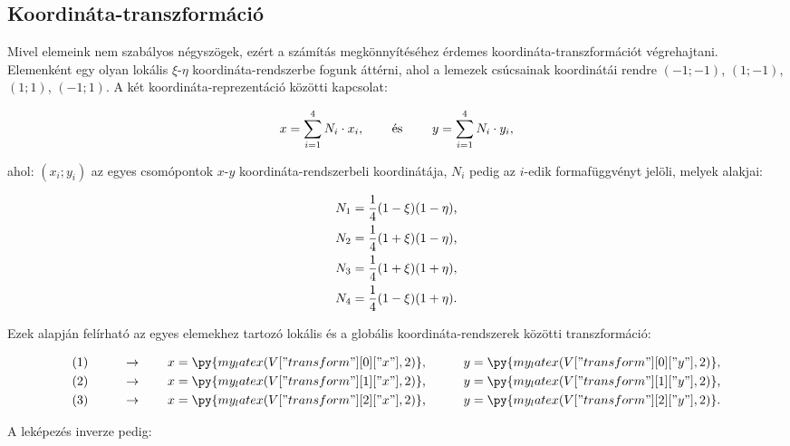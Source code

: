 \subsection{Koordináta-transzformáció}

Mivel elemeink nem szabályos négyszögek, ezért a számítás megkönnyítéséhez
érdemes koordináta-transzformációt végrehajtani. Elemenként egy olyan lokális
$\xi$-$\eta$ koordináta-rendszerbe fogunk áttérni, ahol a lemezek csúcsainak
koordinátái rendre $(-1;-1)$, $(1;-1)$, $(1;1)$, $(-1;1)$. A két
koordináta-reprezentáció közötti kapcsolat:
\begin{myframe}
  \begin{equation}
    x = \sum_{i=1}^4 N_i \cdot x_i
    \text,
    \qquad
    \text{ és }
    \qquad
    y = \sum_{i=1}^4 N_i \cdot y_i
    \text,
  \end{equation}
\end{myframe}
ahol: $(x_i; y_i)$ az egyes csomópontok $x$-$y$ koordináta-rendszerbeli
koordinátája, $N_i$ pedig az $i$-edik formafüggvényt jelöli, melyek alakjai:
\begin{myframe}
  \begin{gather}
    N_1 = \frac{1}{4} (1 - \xi) (1 - \eta) \text, \\
    N_2 = \frac{1}{4} (1 + \xi) (1 - \eta) \text, \\
    N_3 = \frac{1}{4} (1 + \xi) (1 + \eta) \text, \\
    N_4 = \frac{1}{4} (1 - \xi) (1 + \eta) \text.
  \end{gather}
\end{myframe}
Ezek alapján felírható az egyes elemekhez tartozó lokális és a globális
koordináta-rendszerek közötti transzformáció:
\begin{myframe}
  \begin{alignat}{9}
     & (1) \qquad & \rightarrow \qquad x & = \py{my_latex(V["transform"][0]["x"],2)} \text, &  & \qquad y = \py{my_latex(V["transform"][0]["y"],2)} \text,
    \\
     & (2) \qquad & \rightarrow \qquad x & = \py{my_latex(V["transform"][1]["x"],2)} \text, &  & \qquad y = \py{my_latex(V["transform"][1]["y"],2)} \text,
    \\
     & (3) \qquad & \rightarrow \qquad x & = \py{my_latex(V["transform"][2]["x"],2)} \text, &  & \qquad y = \py{my_latex(V["transform"][2]["y"],2)} \text.
  \end{alignat}
\end{myframe}
A leképezés inverze pedig:
